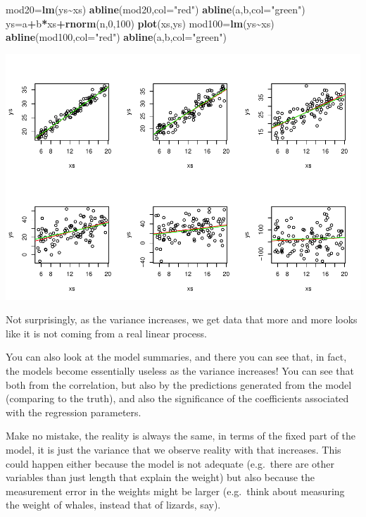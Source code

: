 \documentclass[
]{book}
\newenvironment{Shaded}{\begin{snugshade}}{\end{snugshade}}
\newcommand{\AttributeTok}[1]{\textcolor[rgb]{0.13,0.29,0.53}{#1}}
\newcommand{\DecValTok}[1]{\textcolor[rgb]{0.00,0.00,0.81}{#1}}
\newcommand{\FunctionTok}[1]{\textcolor[rgb]{0.13,0.29,0.53}{\textbf{#1}}}
\newcommand{\NormalTok}[1]{#1}
\newcommand{\OtherTok}[1]{\textcolor[rgb]{0.56,0.35,0.01}{#1}}
\newcommand{\SpecialCharTok}[1]{\textcolor[rgb]{0.81,0.36,0.00}{\textbf{#1}}}
\newcommand{\StringTok}[1]{\textcolor[rgb]{0.31,0.60,0.02}{#1}}
\begin{document}
\begin{Shaded}
\begin{Highlighting}[]
\NormalTok{mod20}\OtherTok{=}\FunctionTok{lm}\NormalTok{(ys}\SpecialCharTok{\textasciitilde{}}\NormalTok{xs)}
\FunctionTok{abline}\NormalTok{(mod20,}\AttributeTok{col=}\StringTok{"red"}\NormalTok{)}
\FunctionTok{abline}\NormalTok{(a,b,}\AttributeTok{col=}\StringTok{"green"}\NormalTok{)}
\NormalTok{ys}\OtherTok{=}\NormalTok{a}\SpecialCharTok{+}\NormalTok{b}\SpecialCharTok{*}\NormalTok{xs}\SpecialCharTok{+}\FunctionTok{rnorm}\NormalTok{(n,}\DecValTok{0}\NormalTok{,}\DecValTok{100}\NormalTok{)}
\FunctionTok{plot}\NormalTok{(xs,ys)}
\NormalTok{mod100}\OtherTok{=}\FunctionTok{lm}\NormalTok{(ys}\SpecialCharTok{\textasciitilde{}}\NormalTok{xs)}
\FunctionTok{abline}\NormalTok{(mod100,}\AttributeTok{col=}\StringTok{"red"}\NormalTok{)}
\FunctionTok{abline}\NormalTok{(a,b,}\AttributeTok{col=}\StringTok{"green"}\NormalTok{)}
\end{Highlighting}
\end{Shaded}

\includegraphics{ECOMODbook_files/figure-latex/a6.27-1.pdf}

Not surprisingly, as the variance increases, we get data that more and more looks like it is not coming from a real linear process.

You can also look at the model summaries, and there you can see that, in fact, the models become essentially useless as the variance increases! You can see that both from the correlation, but also by the predictions generated from the model (comparing to the truth), and also the significance of the coefficients associated with the regression parameters.

Make no mistake, the reality is always the same, in terms of the fixed part of the model, it is just the variance that we observe reality with that increases. This could happen either because the model is not adequate (e.g.~there are other variables than just length that explain the weight) but also because the measurement error in the weights might be larger (e.g.~think about measuring the weight of whales, instead that of lizards, say).
\end{document}

